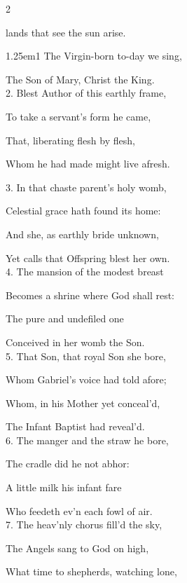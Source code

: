 \begin{multicols}{2}
\sloppy

 lands that see the sun arise.


\begin{hangparas}{1.25em}{1}
The Virgin-born to-day we sing,

The Son of Mary, Christ the King.\\

2. Blest Author of this earthly frame,

To take a servant's form he came,

That, liberating flesh by flesh,

Whom he had made might live afresh.%

3. In that chaste parent's holy womb,

Celestial grace hath found its home:

And she, as earthly bride unknown,

Yet calls that Offspring blest her own.\\

4. The mansion of the modest breast

Becomes a shrine where God shall rest:

The pure and undefiled one

Conceived in her womb the Son.\\

5. That Son, that royal Son she bore,

Whom Gabriel's voice had told afore;

Whom, in his Mother yet conceal'd,

The Infant Baptist had reveal'd.\\

6. The manger and the straw he bore,

The cradle did he not abhor:

A little milk his infant fare

Who feedeth ev'n each fowl of air.\\

7. The heav'nly chorus fill'd the sky,

The Angels sang to God on high,

What time to shepherds, watching lone,

\\


\end{hangparas}
\end{multicols}
